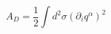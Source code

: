 \begin{equation}
\label{dirimulti}
A_D=\frac{1}{2}\int d^2\sigma (\partial_iq^{\alpha})^2
\end{equation}

